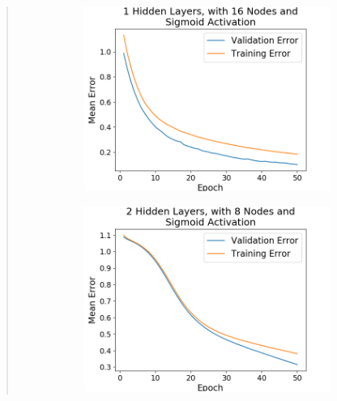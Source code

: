 \documentclass{article}
\begin{document}
\begin{quote}
\begin{figure}[h]
\begin{subfigure}[h]{0.23\textwidth}
	\end{subfigure}
	\begin{subfigure}[h]{0.23\textwidth}
		\includegraphics[width=\textwidth]{figs/Iris_Multiclass_Classification_1_Hidden_Layers_with_16_Nodes_and_Sigmoid_Activation.png}
	\end{subfigure}
	\begin{subfigure}[h]{0.23\textwidth}
		\includegraphics[width=\textwidth]{figs/Iris_Multiclass_Classification_2_Hidden_Layers_with_8_Nodes_and_Sigmoid_Activation.png}
	\end{subfigure}
	\begin{subfigure}[h]{0.23\textwidth}

\end{subfigure}
\end{figure}
\end{quote}
\end{document}
